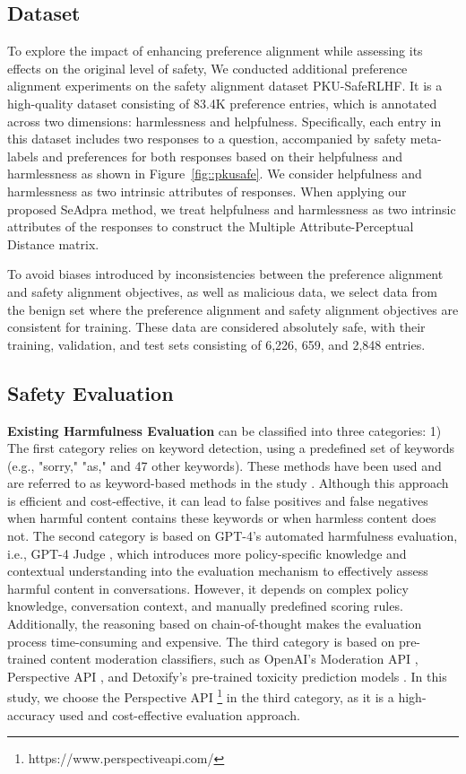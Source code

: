 \subsection{Dataset}
To explore the impact of enhancing preference alignment while assessing its effects on the original level of safety, We conducted additional preference alignment experiments on the safety alignment dataset PKU-SafeRLHF\cite{ji2024beavertails,ji2024pku}.
It is a high-quality dataset consisting of 83.4K preference entries, which is annotated across two dimensions: harmlessness and helpfulness. Specifically, each entry in this dataset includes two responses to a question, accompanied by safety meta-labels and preferences for both responses based on their helpfulness and harmlessness as shown in Figure~\ref{fig::pkusafe}. We consider helpfulness and harmlessness as two intrinsic attributes of responses. 
When applying our proposed SeAdpra method, we treat helpfulness and harmlessness as two intrinsic attributes of the responses to construct the Multiple Attribute-Perceptual Distance matrix.

To avoid biases introduced by inconsistencies between the preference alignment and safety alignment objectives, as well as malicious data, we select data from the benign set where the preference alignment and safety alignment objectives are consistent for training. 
These data are considered absolutely safe, with their training, validation, and test sets consisting of 6,226, 659, and 2,848 entries.
\subsection{Safety Evaluation}
\textbf{Existing Harmfulness Evaluation} can be classified into three categories:  
1) The first category relies on keyword detection, using a predefined set of keywords (e.g., "sorry," "as," and 47 other keywords). These methods have been used \cite{zou2023universal} and are referred to as keyword-based methods in the study \cite{qi2023fine}. Although this approach is efficient and cost-effective, it can lead to false positives and false negatives when harmful content contains these keywords or when harmless content does not.  
The second category is based on GPT-4's automated harmfulness evaluation, i.e., GPT-4 Judge \cite{qi2023fine}, which introduces more policy-specific knowledge and contextual understanding into the evaluation mechanism to effectively assess harmful content in conversations. However, it depends on complex policy knowledge, conversation context, and manually predefined scoring rules. Additionally, the reasoning based on chain-of-thought makes the evaluation process time-consuming and expensive.  
The third category is based on pre-trained content moderation classifiers, such as OpenAI's Moderation API \cite{OpenAI2023a}, Perspective API \cite{lees2022new}, and Detoxify's pre-trained toxicity prediction models \cite{Hanu2020}. In this study, we choose the Perspective API \footnote{https://www.perspectiveapi.com/} in the third category, as it is a high-accuracy used and cost-effective evaluation approach.

